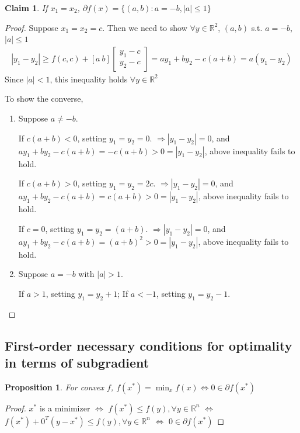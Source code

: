 \documentclass[11pt,a4paper]{article}
\newtheorem{proposition}{Proposition}
\newtheorem{claim}{Claim}
\begin{document}
\begin{claim}
    If $x_1=x_2$, $\partial f(x)=\{(a,b):a=-b,|a|\leq 1\}$
\end{claim}
\begin{proof}
    Suppose $x_1=x_2=c$. Then we need to show $\forall y\in \mathbb{R}^2$, $(a,b)$ s.t. $a=-b$, $|a|\leq 1$
    \begin{equation}
        \begin{aligned}
            |y_1-y_2|\geq f(c,c)+[a\ b]\begin{bmatrix}
                y_1-c\\
                y_2-c
            \end{bmatrix}=ay_1+by_2-c(a+b)=a(y_1-y_2)
        \end{aligned}
        \nonumber
    \end{equation}
    Since $|a|<1$, this inequality holds $\forall y\in \mathbb{R}^2$
    
    To show the converse,
    \begin{enumerate}
        \item Suppose $a\neq -b$.
        
        If $c(a+b)<0$, setting $y_1=y_2=0$. $\Rightarrow |y_1-y_2|=0$, and $ay_1+by_2-c(a+b)=-c(a+b)>0=|y_1-y_2|$, above inequality fails to hold.

        If $c(a+b)>0$, setting $y_1=y_2=2c$. $\Rightarrow |y_1-y_2|=0$, and $ay_1+by_2-c(a+b)=c(a+b)>0=|y_1-y_2|$, above inequality fails to hold.

        If $c=0$, setting $y_1=y_2=(a+b)$. $\Rightarrow |y_1-y_2|=0$, and $ay_1+by_2-c(a+b)=(a+b)^2>0=|y_1-y_2|$, above inequality fails to hold.
        \item Suppose $a=-b$ with $|a|>1$.
        
        If $a>1$, setting $y_1=y_2+1$; If $a<-1$, setting $y_1=y_2-1$.

    \end{enumerate}
\end{proof}

\subsection{First-order necessary conditions for optimality in terms of subgradient}
\begin{proposition}
    For convex $f$, $f(x^*)=\min_x f(x)\Leftrightarrow 0\in \partial f(x^*)$
\end{proposition}
\begin{proof}
    $x^*$ is a minimizer $\Leftrightarrow$ $f(x^*)\leq f(y),\forall y\in \mathbb{R}^n$ $\Leftrightarrow$ $f(x^*)+0^T(y-x^*)\leq f(y),\forall y\in \mathbb{R}^n$ $\Leftrightarrow$ $0\in \partial f(x^*)$
\end{proof}
\end{document}
